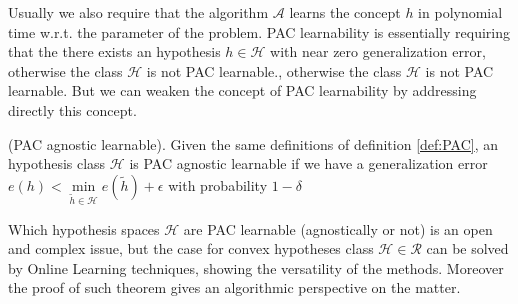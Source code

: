 Usually we also require that the algorithm $\mathcal A$ learns the concept $h$ in polynomial time w.r.t. the parameter of the problem. PAC learnability is essentially requiring that the there exists an hypothesis $h\in\mathcal H$ with near zero generalization error, otherwise the class $\mathcal H$ is not PAC learnable., otherwise the class $\mathcal H$ is not PAC learnable.
But we can weaken the concept of PAC learnability by addressing directly this concept.

\begin{definition}(PAC agnostic learnable).
    Given the same definitions of definition \ref{def:PAC}, an hypothesis class $\mathcal H$ is PAC agnostic learnable if we have a generalization error $e(h)<\min\limits_{\tilde h\in\mathcal H}e(\tilde h)+\epsilon$ with probability $1-\delta$
\end{definition}

Which hypothesis spaces $\mathcal H$ are PAC learnable (agnostically or not) is an open and complex issue, but the case for convex hypotheses class $\mathcal H\in\mathcal R$ can be solved by Online Learning techniques, showing the versatility of the methods. 
Moreover the proof of such theorem gives an algorithmic perspective on the matter.  
